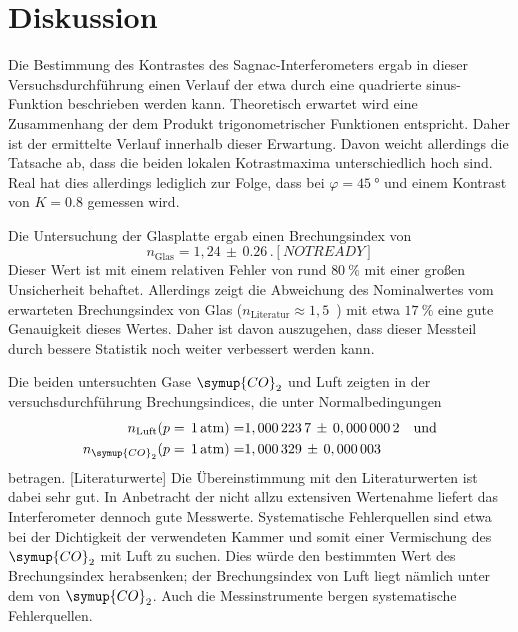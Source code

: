 \section{Diskussion}
\label{sec:diskussion}

Die Bestimmung des Kontrastes des Sagnac-Interferometers ergab in
dieser Versuchsdurchführung einen Verlauf der etwa durch eine
quadrierte sinus-Funktion beschrieben werden kann. Theoretisch
erwartet wird eine Zusammenhang der dem Produkt trigonometrischer
Funktionen entspricht. Daher ist der ermittelte Verlauf innerhalb
dieser Erwartung. Davon weicht allerdings die Tatsache ab, dass die
beiden lokalen Kotrastmaxima unterschiedlich hoch sind. Real hat dies
allerdings lediglich zur Folge, dass bei $\varphi=\SI{45}{\degree}$
und einem Kontrast von $K=0.8$ gemessen wird.

Die Untersuchung der Glasplatte ergab einen Brechungsindex von
%
\begin{equation*}
  n_\text{Glas}=1,24\,\pm\,0.26 \, . [NOT READY]
\end{equation*}
%
Dieser Wert ist mit einem relativen Fehler von rund
$\SI{80}{\percent}$ mit einer großen Unsicherheit behaftet.
Allerdings zeigt die Abweichung des Nominalwertes vom erwarteten
Brechungsindex von Glas ($n_\text{Literatur}\approx
1,5$~\cite{??}) mit etwa $\SI{17}{\percent}$ eine gute Genauigkeit
dieses Wertes. Daher ist davon auszugehen, dass dieser Messteil durch
bessere Statistik noch weiter verbessert werden kann.

Die beiden untersuchten Gase $\symup{CO}_2$ und Luft zeigten in der versuchsdurchführung Brechungsindices, die unter Normalbedingungen
%
\begin{align*}
  n_\text{Luft}(p=\,1\,\text{atm})=& 1,000\,223\,7\,\pm\,0,000\,000\,2 \quad \text{und} \\
  n_{\symup{CO}_2}(p=\,1\,\text{atm})=& 1,000\,329\,\pm\,0,000\,003
\end{align*}
%
betragen. [Literaturwerte]
Die Übereinstimmung mit den Literaturwerten ist dabei sehr gut. In Anbetracht der nicht
allzu extensiven Wertenahme liefert das Interferometer dennoch gute Messwerte.
Systematische Fehlerquellen sind etwa bei der Dichtigkeit der verwendeten Kammer und
somit einer Vermischung des $\symup{CO}_2$ mit Luft zu suchen. Dies würde den bestimmten
Wert des Brechungsindex herabsenken; der Brechungsindex von Luft liegt nämlich unter dem
von $\symup{CO}_2$. Auch die Messinstrumente bergen systematische Fehlerquellen.
